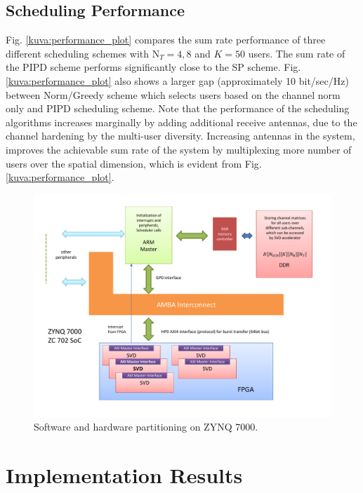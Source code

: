 \documentclass[conference,letterpaper,10pt]{./../../IEEE/IEEEtran}
\begin{document}
\subsection{Scheduling Performance}
Fig. \ref{kuva:performance_plot} compares the sum rate performance of three different scheduling schemes with $\textrm{N}_T = 4,8$ and $K = 50$ users. The sum rate of the PIPD scheme performs significantly close to the SP scheme. Fig. \ref{kuva:performance_plot} also shows a larger gap (approximately 10 bit/sec/Hz) between Norm/Greedy scheme which selects users based on the channel norm only and PIPD scheduling scheme. Note that the performance of the scheduling algorithms increases marginally by adding additional receive antennas, due to the channel hardening by the multi-user diversity. Increasing  antennas in the system, improves the achievable sum rate of the system by multiplexing more number of users over the spatial dimension, which is evident from Fig. \ref{kuva:performance_plot}.
\begin{figure}
	\centering
	\includegraphics[trim=.75in .75in .75in .75in,width=\columnwidth]{blk_diag}
	\caption{Software and hardware partitioning on ZYNQ 7000.}
	\label{kuva:block_diag}
\end{figure}

\section{Implementation Results}
\label{sec:implementation}
\end{document}
